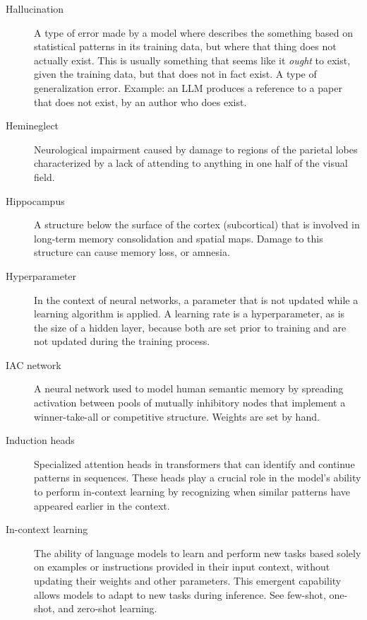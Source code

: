 \begin{description}
\item[Hallucination] A type of error made by a model where describes the something based on statistical patterns in its training data, but where that thing does not actually exist. This is usually something that seems like it \emph{ought} to exist, given the training data, but that does not in fact exist. A type of generalization error. Example: an LLM produces a reference to a paper that does not exist, by an author who does exist.

\item[Hemineglect] Neurological impairment caused by damage to regions of the parietal lobes characterized by a lack of attending to anything in one half of the visual field.

\item[Hippocampus] A structure below the surface of the cortex (subcortical) that is involved in long-term memory consolidation and spatial maps. Damage to this structure can cause memory loss, or amnesia. 


\item[Hyperparameter] In the context of neural networks, a parameter that is not updated while a learning algorithm is applied. A learning rate is a hyperparameter, as is the size of a hidden layer, because both are set prior to training and are not updated during the training process.

\item[IAC network] A neural network used to model human semantic memory by spreading activation between pools of mutually inhibitory nodes that implement a winner-take-all or competitive structure. Weights are set by hand. 

\item[Induction heads] Specialized attention heads in transformers that can identify and continue patterns in sequences. These heads play a crucial role in the model's ability to perform in-context learning by recognizing when similar patterns have appeared earlier in the context.

\item[In-context learning] The ability of language models to learn and perform new tasks based solely on examples or instructions provided in their input context, without updating their weights and other parameters. This emergent capability allows models to adapt to new tasks during inference. See few-shot, one-shot, and zero-shot learning.


\end{description}
